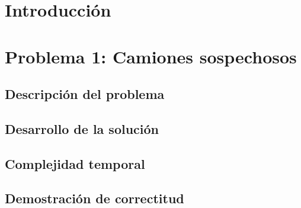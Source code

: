 \documentclass[a4paper, 10pt, twoside]{article}
\begin{document}
\newpage



\tableofcontents

\newpage



\section{Introducción}


\newpage



\section{Problema 1: Camiones sospechosos}

\subsection{Descripción del problema}


\subsection{Desarrollo de la solución}


\subsection{Complejidad temporal}


\subsection{Demostración de correctitud}

\end{document}
